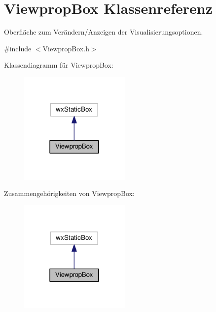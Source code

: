 \hypertarget{classViewpropBox}{\section{Viewprop\-Box Klassenreferenz}
\label{classViewpropBox}
}


Oberfläche zum Verändern/\-Anzeigen der Visualisierungsoptionen.  




{\ttfamily \#include $<$Viewprop\-Box.\-h$>$}



Klassendiagramm für Viewprop\-Box\-:
\nopagebreak
\begin{figure}[H]
\begin{center}
\leavevmode
\includegraphics[width=154pt]{classViewpropBox__inherit__graph}
\end{center}
\end{figure}


Zusammengehörigkeiten von Viewprop\-Box\-:
\nopagebreak
\begin{figure}[H]
\begin{center}
\leavevmode
\includegraphics[width=154pt]{classViewpropBox__coll__graph}
\end{center}
\end{figure}
